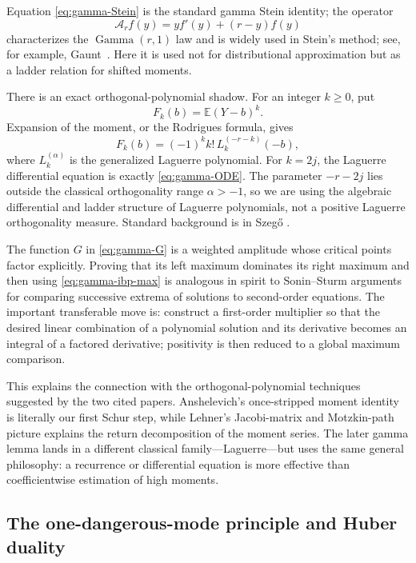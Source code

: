\documentclass[11pt]{article}
\newcommand{\E}{\mathbb E}
\newcommand{\GammaLaw}{\operatorname{Gamma}}
\begin{document}
Equation \eqref{eq:gamma-Stein} is the standard gamma Stein identity; the
operator
\[
       \mathcal A_rf(y)=yf'(y)+(r-y)f(y)
\]
characterizes the \(\GammaLaw(r,1)\) law and is widely used in Stein's
method; see, for example, Gaunt~\cite{Gaunt2016}.  Here it is used not for
distributional approximation but as a ladder relation for shifted moments.

There is an exact orthogonal-polynomial shadow.  For an integer \(k\ge0\),
put
\[
       F_k(b)=\E(Y-b)^k.
\]
Expansion of the moment, or the Rodrigues formula, gives
\begin{equation}\label{eq:Laguerre-identity}
       F_k(b)=(-1)^k k!\,L_k^{(-r-k)}(-b),
\end{equation}
where \(L_k^{(\alpha)}\) is the generalized Laguerre polynomial.  For
\(k=2j\), the Laguerre differential equation is exactly
\eqref{eq:gamma-ODE}.  The parameter \(-r-2j\) lies outside the classical
orthogonality range \(\alpha>-1\), so we are using the algebraic differential
and ladder structure of Laguerre polynomials, not a positive Laguerre
orthogonality measure.  Standard background is in Szeg\H{o}
\cite{Szego1975}.

The function \(G\) in \eqref{eq:gamma-G} is a weighted amplitude whose
critical points factor explicitly.  Proving that its left maximum dominates
its right maximum and then using \eqref{eq:gamma-ibp-max} is analogous in
spirit to Sonin--Sturm arguments for comparing successive extrema of
solutions to second-order equations.  The important transferable move is:
construct a first-order multiplier so that the desired linear combination
of a polynomial solution and its derivative becomes an integral of a
factored derivative; positivity is then reduced to a global maximum
comparison.

This explains the connection with the orthogonal-polynomial techniques
suggested by the two cited papers.  Anshelevich's once-stripped moment
identity is literally our first Schur step, while Lehner's Jacobi-matrix and
Motzkin-path picture explains the return decomposition of the moment series.
The later gamma lemma lands in a different classical family---Laguerre---but
uses the same general philosophy: a recurrence or differential equation is
more effective than coefficientwise estimation of high moments.

\subsection{The one-dangerous-mode principle and Huber duality}
\end{document}

